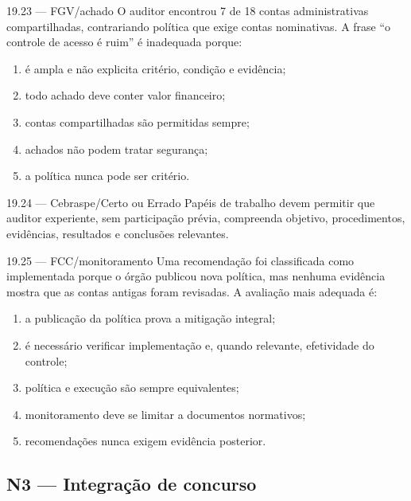 \begin{questao}{ 19.23 — FGV/achado}
O auditor encontrou 7 de 18 contas administrativas compartilhadas, contrariando política que exige contas nominativas. A frase ``o controle de acesso é ruim'' é inadequada porque:
\begin{enumerate}[label=\Alph*)]
\item é ampla e não explicita critério, condição e evidência;
\item todo achado deve conter valor financeiro;
\item contas compartilhadas são permitidas sempre;
\item achados não podem tratar segurança;
\item a política nunca pode ser critério.
\end{enumerate}
\end{questao}

\begin{questao}{ 19.24 — Cebraspe/Certo ou Errado}
Papéis de trabalho devem permitir que auditor experiente, sem participação prévia, compreenda objetivo, procedimentos, evidências, resultados e conclusões relevantes.
\end{questao}

\begin{questao}{ 19.25 — FCC/monitoramento}
Uma recomendação foi classificada como implementada porque o órgão publicou nova política, mas nenhuma evidência mostra que as contas antigas foram revisadas. A avaliação mais adequada é:
\begin{enumerate}[label=\Alph*)]
\item a publicação da política prova a mitigação integral;
\item é necessário verificar implementação e, quando relevante, efetividade do controle;
\item política e execução são sempre equivalentes;
\item monitoramento deve se limitar a documentos normativos;
\item recomendações nunca exigem evidência posterior.
\end{enumerate}
\end{questao}

\subsection*{N3 — Integração de concurso}

